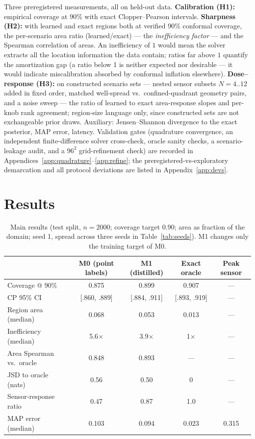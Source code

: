 \documentclass{article}
\begin{document}
Three preregistered measurements, all on held-out data. \textbf{Calibration (H1):}
empirical coverage at $90\%$ with exact Clopper--Pearson intervals. \textbf{Sharpness
(H2):} with learned and exact regions both at verified $90\%$ conformal coverage, the
per-scenario area ratio (learned/exact) --- the \emph{inefficiency factor} --- and the
Spearman correlation of areas. An inefficiency of $1$ would mean the solver extracts all
the location information the data contain; ratios far above $1$ quantify the amortization
gap (a ratio below 1 is neither expected nor desirable --- it would indicate
miscalibration absorbed by conformal inflation elsewhere). \textbf{Dose--response (H3):}
on constructed scenario sets --- nested sensor subsets $N = 4..12$ added in fixed order,
matched well-spread vs.\ confined-quadrant geometry pairs, and a noise sweep --- the
ratio of learned to exact area-response slopes and per-knob rank agreement; region-size
language only, since constructed sets are not exchangeable prior draws. Auxiliary:
Jensen--Shannon divergence to the exact posterior, MAP error, latency. Validation gates
(quadrature convergence, an independent finite-difference solver cross-check, oracle
sanity checks, a scenario-leakage audit, and a $96^2$ grid-refinement check) are recorded
in Appendices~\ref{app:quadrature}--\ref{app:refine}; the preregistered-vs-exploratory
demarcation and all protocol deviations are listed in Appendix~\ref{app:devs}.

\section{Results}

\begin{table}[t]
  \caption{Main results (test split, $n = 2000$; coverage target $0.90$; area as fraction
  of the domain; seed 1, spread across three seeds in Table~\ref{tab:seeds}). M1 changes
  only the training target of M0.}
  \label{tab:headline}
  \centering
  \small
  \begin{tabular}{lcccc}
    \toprule
    & M0 (point labels) & M1 (distilled) & Exact oracle & Peak sensor \\
    \midrule
    Coverage @ 90\% & 0.875 & 0.899 & 0.907 & --- \\
    \quad CP 95\% CI & [.860, .889] & [.884, .911] & [.893, .919] & --- \\
    Region area (median) & 0.068 & 0.053 & 0.013 & --- \\
    Inefficiency (median) & 5.6$\times$ & 3.9$\times$ & 1$\times$ & --- \\
    Area Spearman vs.\ oracle & 0.848 & 0.893 & --- & --- \\
    JSD to oracle (nats) & 0.56 & 0.50 & 0 & --- \\
    Sensor-response ratio & 0.47 & 0.87 & 1.0 & --- \\
    MAP error (median) & 0.103 & 0.094 & 0.023 & 0.315 \\
    \bottomrule
  \end{tabular}
\end{table}
\end{document}
